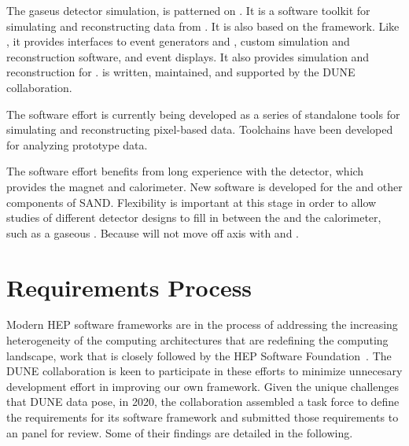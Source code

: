 \documentclass[../main-v1.tex]{subfiles}
\begin{document}

The gaseus detector simulation,  is patterned on .  It is a software toolkit for simulating and reconstructing data from .  It is also based on the  framework.  Like , it provides interfaces to event generators and , custom simulation and reconstruction software, and event displays.  It also provides simulation and reconstruction for .   is written, maintained, and supported by the DUNE collaboration.

The  software effort is currently being developed as a series of standalone tools for simulating and reconstructing pixel-based  data.  Toolchains have been developed for analyzing  prototype data.

The  software effort benefits from long experience with the  detector, which provides the magnet and calorimeter.  New software is developed for the  and other components of SAND.  Flexibility is important at this stage in order to allow studies of different detector designs to fill in between the  and the calorimeter, such as a gaseous .  Because  will not move off axis with  and .


\section{Requirements Process} %
Modern HEP software frameworks are in the process of addressing the increasing heterogeneity of the computing architectures that are redefining the computing landscape, work that is closely followed by the HEP Software Foundation~\cite{Alves:2017she, Calafiura:2018rwe}. The DUNE collaboration is keen to participate in these efforts to minimize unnecesary development effort in improving our own framework. 
Given the unique challenges that DUNE data pose, in 2020, the collaboration assembled a task force to define the requirements for its software framework and submitted those requirements to an  panel for review.   Some of their findings are detailed in the following.
\end{document}
